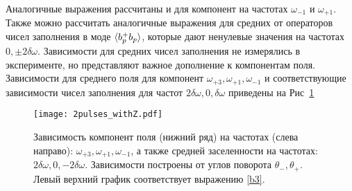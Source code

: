 Аналогичные выражения рассчитаны и для компонент на частотах $\omega_{-1}$ и $\omega_{+1}$. Также можно рассчитать аналогичные выражения для средних от операторов чисел заполнения в моде $\braket{b^+_p b_p}$, которые дают ненулевые значения на частотах $0, \pm 2 \delta\omega$. Зависимости для средних чисел заполнения не измерялись в эксперименте, но представляют важное дополнение к компонентам поля. Зависимости для среднего поля для компонент $\omega_{+3}, \omega_{+1}, \omega_{-1}$ и соответствующие зависимости чисел заполнения для частот $2\delta\omega, 0, \delta\omega$ приведены на Рис~\ref{fig: 2pulses}
\begin{figure}
\centering
\texttt{[image: 2pulses\_withZ.pdf]}
\caption[Зависимости полей и средних заселенностей на боковых компонентах от углов поворота для квантового смешения]{Зависимость компонент поля (нижний ряд) на частотах (слева направо): $\omega_{+3}, \omega_{+1}, \omega_{-1}$, а также средней заселенности на частотах: $2\delta\omega, 0, -2\delta\omega$. Зависимости построены от углов поворота $\theta_-, \theta_+$. Левый верхний график соответствует выражению \eqref{b3}.   }
\label{fig: 2pulses}
\end{figure}

